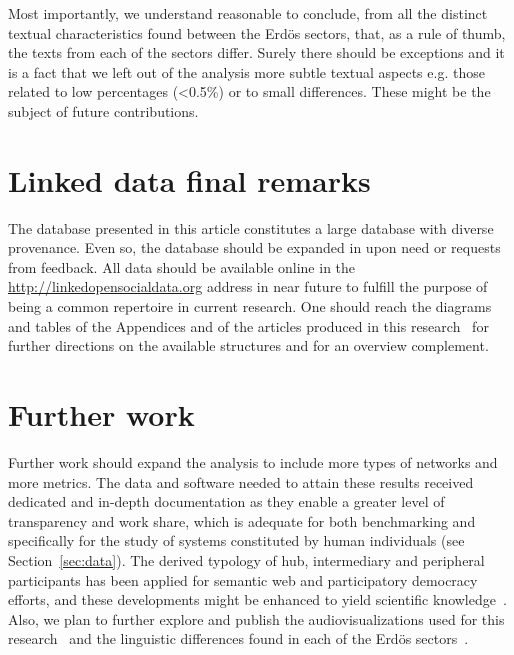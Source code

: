 Most importantly, we understand reasonable to conclude, from all the distinct textual characteristics
found between the Erd\"os sectors, that, as a rule of thumb, the texts from each of the sectors differ.
Surely there should be exceptions and it is a fact that we left out of the analysis
more subtle textual aspects e.g. those related to low percentages (<0.5\%) or to small
differences.
These might be the subject of future contributions.

\section{Linked data final remarks}
The database presented in this article
constitutes a large database with diverse provenance.
Even so, the database should be expanded in upon need or requests from feedback.
All data should be available online in the \url{http://linkedopensocialdata.org}
address in near future to fulfill the purpose of being a common
repertoire in current research.
One should reach the diagrams and tables of the 
Appendices and of the articles produced in this research~\cite{stab,rcText,versinus,losd}
for further directions
on the available structures and for an overview complement.


\section{Further work}\label{sec:fw}

Further work should expand the analysis to include
more types of networks and more metrics.
The data and software needed to attain these results
received dedicated and in-depth
documentation as they enable a greater level of transparency
and work share,
which is adequate for both benchmarking
and specifically for the study of systems constituted
by human individuals (see Section~\ref{sec:data}).
The derived typology of hub, intermediary and peripheral participants
has been applied for semantic web and participatory democracy efforts,
and these developments might be enhanced to yield scientific knowledge~\cite{pnud4,opa,losd}.
Also, we plan to further explore and publish the audiovisualizations
used for this research~\cite{versinus,animacoes} and
the linguistic differences found in each of the Erd\"os sectors~\cite{rcText}.

